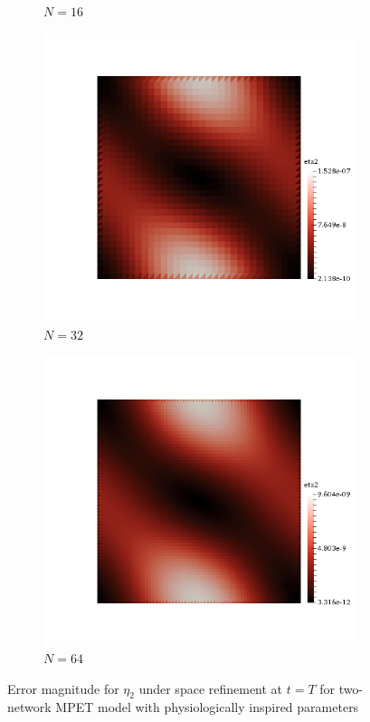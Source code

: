 \begin{figure}[h!]
\begin{subfigure}[b]{0.24\textwidth}
    \caption{$N=16$}
  \end{subfigure}
  \begin{subfigure}[b]{0.24\textwidth}
    \includegraphics[width=\textwidth,height=\textheight,keepaspectratio,height=\textheight,keepaspectratio]{figures/2_mpet/biomedical/space/eta2_32.png}
    \caption{$N=32$}
  \end{subfigure}
  \begin{subfigure}[b]{0.24\textwidth}
    \includegraphics[width=\textwidth,height=\textheight,keepaspectratio,height=\textheight,keepaspectratio]{figures/2_mpet/biomedical/space/eta2_64.png}
    \caption{$N=64$}
  \end{subfigure}
  \caption{Error magnitude for $\eta_2$ under space refinement at $t=T$ for two-network MPET model with physiologically inspired parameters} \label{fig:bb_bio_eta2}
\end{figure}
